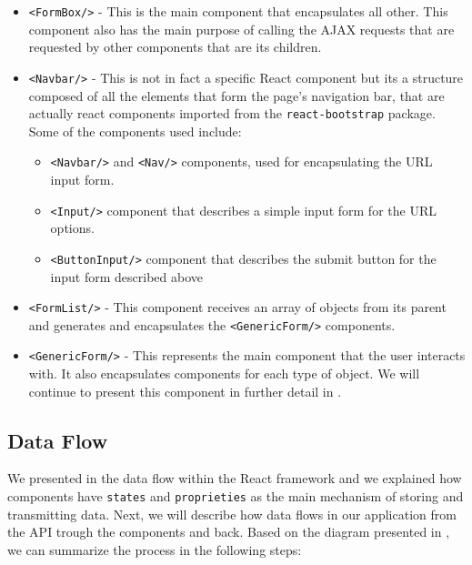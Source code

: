 \begin{itemize}
	\item \texttt{<FormBox/>} - This is the main component that encapsulates all other. This component also has the main purpose of calling the AJAX requests that are requested by other components that are its children.
	\item \texttt{<Navbar/>} - This is not in fact a specific React component but its a structure composed of all the elements that form the page's navigation bar, that are actually react components imported from the \texttt{react-bootstrap} package. Some of the components used include:
	  \begin{itemize}
	  	\item \texttt{<Navbar/>} and \texttt{<Nav/>} components, used for encapsulating the URL input form.
	  	\item \texttt{<Input/>} component that describes a simple input form for the URL options.
	  	\item \texttt{<ButtonInput/>} component that describes the submit button for the input form described above
	  \end{itemize}
	\item \texttt{<FormList/>} - This component receives an array of objects from its parent and generates and encapsulates the \texttt{<GenericForm/>} components.
	\item \texttt{<GenericForm/>} - This represents the main component that the user interacts with. It also encapsulates components for each type of object. We will continue to present this component in further detail in  .
\end{itemize}


\subsection{Data Flow}
\label{sub-sec:data-flow}

We presented in  the data flow within the React framework and we explained how components have \texttt{states} and \texttt{proprieties} as the main mechanism of storing and transmitting data. Next, we will describe how data flows in our application from the API trough the components and back. Based on the diagram presented in , we can summarize the process in the following steps:



